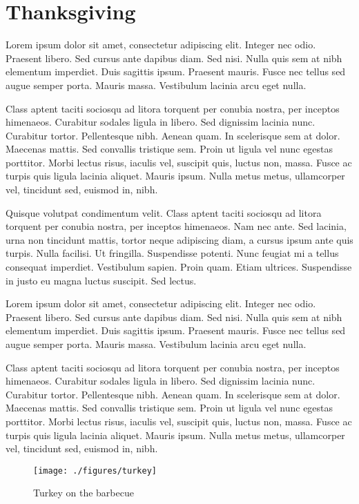 \documentclass[12pt, final]{book}
\begin{document}
\chapter{Thanksgiving}\label{chapter2}
Lorem ipsum dolor sit amet, consectetur adipiscing elit. Integer nec odio. Praesent libero. Sed cursus ante dapibus diam. Sed nisi. Nulla quis sem at nibh elementum imperdiet. Duis sagittis ipsum. Praesent mauris. Fusce nec tellus sed augue semper porta. Mauris massa. Vestibulum lacinia arcu eget nulla. 

Class aptent taciti sociosqu ad litora torquent per conubia nostra, per inceptos himenaeos. Curabitur sodales ligula in libero. Sed dignissim lacinia nunc. Curabitur tortor. Pellentesque nibh. Aenean quam. In scelerisque sem at dolor. Maecenas mattis. Sed convallis tristique sem. Proin ut ligula vel nunc egestas porttitor. Morbi lectus risus, iaculis vel, suscipit quis, luctus non, massa. Fusce ac turpis quis ligula lacinia aliquet. Mauris ipsum. Nulla metus metus, ullamcorper vel, tincidunt sed, euismod in, nibh. 


Quisque volutpat condimentum velit. Class aptent taciti sociosqu ad litora torquent per conubia nostra, per inceptos himenaeos. Nam nec ante. Sed lacinia, urna non tincidunt mattis, tortor neque adipiscing diam, a cursus ipsum ante quis turpis. Nulla facilisi. Ut fringilla. Suspendisse potenti. Nunc feugiat mi a tellus consequat imperdiet. Vestibulum sapien. Proin quam. Etiam ultrices. Suspendisse in justo eu magna luctus suscipit. Sed lectus. 

Lorem ipsum dolor sit amet, consectetur adipiscing elit. Integer nec odio. Praesent libero. Sed cursus ante dapibus diam. Sed nisi. Nulla quis sem at nibh elementum imperdiet. Duis sagittis ipsum. Praesent mauris. Fusce nec tellus sed augue semper porta. Mauris massa. Vestibulum lacinia arcu eget nulla. 

Class aptent taciti sociosqu ad litora torquent per conubia nostra, per inceptos himenaeos. Curabitur sodales ligula in libero. Sed dignissim lacinia nunc. Curabitur tortor. Pellentesque nibh. Aenean quam. In scelerisque sem at dolor. Maecenas mattis. Sed convallis tristique sem. Proin ut ligula vel nunc egestas porttitor. Morbi lectus risus, iaculis vel, suscipit quis, luctus non, massa. Fusce ac turpis quis ligula lacinia aliquet. Mauris ipsum. Nulla metus metus, ullamcorper vel, tincidunt sed, euismod in, nibh. 

\begin{figure}[t]
\begin{center}
\texttt{[image: ./figures/turkey]}
\end{center}
\caption*{Turkey on the barbecue}
\end{figure}
\clearpage

\newpage

\newpage

\newpage

\newpage

\newpage

\newpage


\end{document}
